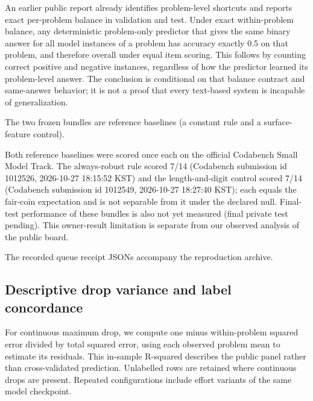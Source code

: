 An earlier public report already identifies problem-level shortcuts and reports exact per-problem balance in validation and test. Under exact within-problem balance, any deterministic problem-only predictor that gives the same binary answer for all model instances of a problem has accuracy exactly 0.5 on that problem, and therefore overall under equal item scoring. This follows by counting correct positive and negative instances, regardless of how the predictor learned its problem-level answer. The conclusion is conditional on that balance contract and same-answer behavior; it is not a proof that every text-based system is incapable of generalization. \citep{S7}


The two frozen bundles are reference baselines (a constant rule and a surface-feature control).


Both reference baselines were scored once each on the official Codabench Small Model Track. The always-robust rule scored 7/14 (Codabench submission id 1012526, 2026-10-27 18:15:52 KST) and the length-and-digit control scored 7/14 (Codabench submission id 1012549, 2026-10-27 18:27:40 KST); each equals the fair-coin expectation and is not separable from it under the declared null. Final-test performance of these bundles is also not yet measured (final private test pending). This owner-result limitation is separate from our observed analysis of the public board.


The recorded queue receipt JSONs accompany the reproduction archive.


\subsection{Descriptive drop variance and label concordance}

For continuous maximum drop, we compute one minus within-problem squared error divided by total squared error, using each observed problem mean to estimate its residuals. This in-sample R-squared describes the public panel rather than cross-validated prediction. Unlabelled rows are retained where continuous drops are present. Repeated configurations include effort variants of the same model checkpoint.


